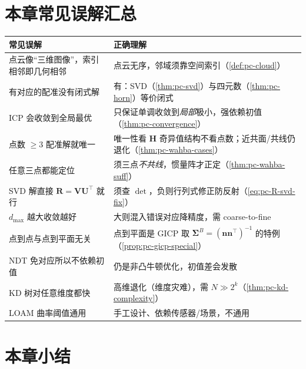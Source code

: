 \section*{本章常见误解汇总}
\begin{table}[H]\centering\small
\begin{tabular}{p{} p{}}
\toprule
\textbf{常见误解} & \textbf{正确理解} \\
\midrule
点云像“三维图像”，索引相邻即几何相邻 & 点云无序，邻域须靠空间索引（\cref{def:pc-cloud}）\\
有对应的配准没有闭式解 & 有：SVD（\cref{thm:pc-svd}）与四元数（\cref{thm:pc-horn}）等价闭式 \\
ICP 会收敛到全局最优 & 只保证单调收敛到\emph{局部}极小，强依赖初值（\cref{thm:pc-convergence}）\\
点数 $\ge3$ 配准解就唯一 & 唯一性看 $\mathbf{H}$ 奇异值结构不看点数；近共面/共线仍退化（\cref{thm:pc-wahba-cases}）\\
任意三点都能定位 & 须三点\emph{不共线}，惯量阵才正定（\cref{thm:pc-wahba-suff}）\\
SVD 解直接 $\mathbf{R}=\mathbf{V}\mathbf{U}^\top$ 就行 & 须查 $\det$，负则行列式修正防反射（\cref{eq:pc-R-svd-fix}）\\
$d_{\max}$ 越大收敛越好 & 大则混入错误对应降精度，需 coarse-to-fine \\
点到点与点到平面无关 & 点到平面是 GICP 取 $\boldsymbol{\Sigma}^B=(\mathbf{n}\mathbf{n}^\top)^{-1}$ 的特例（\cref{prop:pc-gicp-special}）\\
NDT 免对应所以不依赖初值 & 仍是非凸牛顿优化，初值差会发散 \\
KD 树对任意维度都快 & 高维退化（维度灾难），需 $N\gg2^k$（\cref{thm:pc-kd-complexity}）\\
LOAM 曲率阈值通用 & 手工设计、依赖传感器/场景，不通用 \\
\bottomrule
\end{tabular}
\end{table}

\section*{本章小结}

